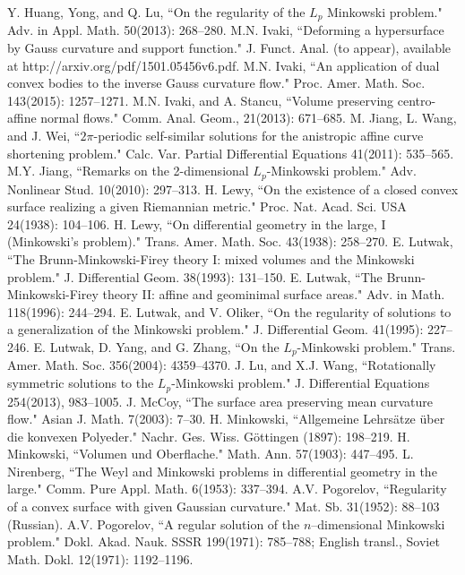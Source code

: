 \documentclass{amsart}
\theoremstyle{definition}
\theoremstyle{remark}
\numberwithin{equation}{section}
\begin{document}
\begin{thebibliography}{10}
Y. Huang, Yong, and Q. Lu, ``On the regularity of the $L_p$ Minkowski problem." Adv. in Appl. Math. 50(2013): 268--280.
 M.N. Ivaki, ``Deforming a hypersurface by Gauss curvature and support function."  J. Funct. Anal. (to appear), available at http://arxiv.org/pdf/1501.05456v6.pdf.
 M.N. Ivaki, ``An application of dual convex bodies to the inverse Gauss curvature flow." Proc. Amer. Math. Soc. 143(2015): 1257--1271.
 M.N. Ivaki, and A. Stancu, ``Volume preserving centro-affine normal flows." Comm. Anal. Geom., 21(2013): 671--685.
  M. Jiang, L. Wang, and J. Wei, ``$2\pi$-periodic self-similar solutions for the anistropic affine curve shortening problem." Calc. Var. Partial Differential Equations 41(2011): 535--565.
 M.Y. Jiang, ``Remarks on the 2-dimensional $L_p$-Minkowski problem." Adv. Nonlinear Stud. 10(2010): 297--313.
H. Lewy, ``On the existence of a closed convex surface realizing a given Riemannian metric." Proc. Nat. Acad. Sci. USA 24(1938): 104--106.
H. Lewy, ``On differential geometry in the large, I (Minkowski's problem)." Trans. Amer. Math. Soc. 43(1938): 258--270.
 E. Lutwak, ``The Brunn-Minkowski-Firey theory I: mixed volumes and the Minkowski problem." J. Differential Geom. 38(1993): 131--150.
 E. Lutwak, ``The Brunn-Minkowski-Firey theory II: affine and geominimal surface areas." Adv. in Math. 118(1996): 244--294.
 E. Lutwak, and V. Oliker, ``On the regularity of solutions to a generalization of the Minkowski problem." J. Differential Geom. 41(1995): 227--246.
 E. Lutwak, D. Yang,  and G. Zhang, ``On the $L_p$-Minkowski problem." Trans. Amer. Math. Soc. 356(2004): 4359--4370.
  J. Lu, and X.J. Wang, ``Rotationally symmetric solutions to the $L_p$-Minkowski problem." J. Differential Equations 254(2013), 983--1005.
 J. McCoy, ``The surface area preserving mean curvature flow." Asian J. Math. 7(2003): 7--30.
 H. Minkowski, ``Allgemeine Lehrs\"{a}tze \"{u}ber die konvexen Polyeder." Nachr. Ges. Wiss. G\"{o}ttingen (1897): 198--219.
 H. Minkowski, ``Volumen und Oberflache." Math. Ann. 57(1903): 447--495.
  L. Nirenberg, ``The Weyl and Minkowski problems in differential geometry in the large." Comm. Pure Appl. Math. 6(1953): 337--394.
 A.V. Pogorelov, ``Regularity of a convex surface with given Gaussian curvature." Mat. Sb. 31(1952): 88--103 (Russian).
 A.V. Pogorelov, ``A regular solution of the $n$–dimensional Minkowski problem." Dokl. Akad. Nauk. SSSR 199(1971): 785--788; English transl., Soviet Math. Dokl. 12(1971): 1192--1196.

\end{thebibliography}
\end{document}
